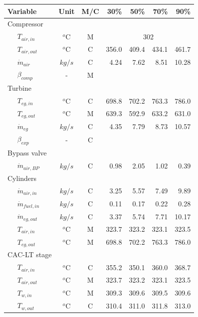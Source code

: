 \documentclass[preprint,12pt]{elsarticle}
\begin{document}
\begin{table}
	\small
	\centering
	\begin{tabular}{llccrrrr}
		\hline
		\multicolumn{2}{l}{Variable} & Unit & M/C & 30\% & 50\% & 70\% & 90\% \\
		\hline
		\multicolumn{2}{l}{Compressor} & & & & & & \\ 
		& 	$T_{air,in}$  		& $^o$C & M & \multicolumn{4}{c}{302} \\ 
		&	$T_{air,out}$  		& $^o$C & C  & 356.0 & 409.4 & 434.1 & 461.7 \\ 
		&	$\dot{m}_{air}$  	& $kg/s$ & C  & 4.24 & 7.62 & 8.51 & 10.28 \\
		&   $\beta_{comp}$		& - 	& M & & & &  \\
		\multicolumn{2}{l}{Turbine} & & & & & &  \\
		&	$T_{eg,in}$   		& $^o$C & C  & 698.8 & 702.2 & 763.3 & 786.0 \\ 
		&	$T_{eg,out}$  		& $^o$C & M  & 639.3 & 592.9 & 633.2 & 631.0 \\ 
		&	$\dot{m}_{eg}$  	& $kg/s$ & C  & 4.35 & 7.79 & 8.73 & 10.57 \\
		&   $\beta_{exp}$		& - 	& C & & & &  \\
		\multicolumn{2}{l}{Bypass valve} & & & & & &  \\
		&	$\dot{m}_{air,BP}$	& $kg/s$ & C  & 0.98 & 2.05 & 1.02 & 0.39 \\  
		\multicolumn{2}{l}{Cylinders} & & & & & &   \\
		&	$\dot{m}_{air,in}$  & $kg/s$ & C  & 3.25 & 5.57 & 7.49 & 9.89 \\
		&	$\dot{m}_{fuel,in}$ & $kg/s$ & C  & 0.11 & 0.17 & 0.22 & 0.28 \\ 
		&	$\dot{m}_{eg,out}$  & $kg/s$ & C  & 3.37 & 5.74 & 7.71 & 10.17 \\
		&	$T_{air,in}$  		& $^o$C & M  & 323.7 & 323.2 & 323.1 & 323.5 \\ 
		&	$T_{eg,out}$  		& $^o$C & M  & 698.8 & 702.2 & 763.3 & 786.0 \\ 
		\multicolumn{2}{l}{CAC-LT stage} & & & & & &  \\
		&	$T_{air,in}$  		& $^o$C & C  & 355.2 & 350.1 & 360.0 & 368.7 \\ 
		&	$T_{air,out}$ 		& $^o$C & M  & 323.7 & 323.2 & 323.1 & 323.5 \\
		&	$T_{w,in}$   		& $^o$C & M  & 309.3 & 309.6 & 309.5 & 309.6 \\
		&	$T_{w,out}$   		& $^o$C & C  & 310.4 & 311.0 & 311.8 & 313.0 \\  

\end{tabular}
\end{table}
\end{document}
